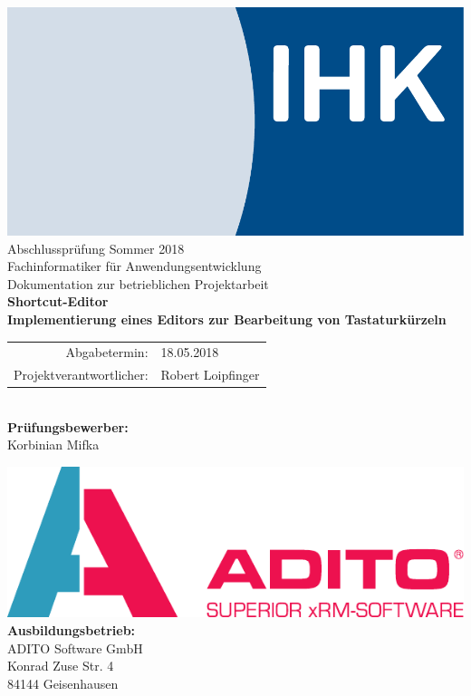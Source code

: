 \begin{titlepage}

\begin{center}
\includegraphics[scale=0.25]{../img/LogoIHK.pdf}\\[1ex]
\Large{Abschlussprüfung Sommer 2018}\\[3ex]

\Large{Fachinformatiker für Anwendungsentwicklung}\\
\LARGE{Dokumentation zur betrieblichen Projektarbeit}\\[4ex]

\huge{\textbf{Shortcut-Editor}}\\[1.5ex]
\Large{\textbf{Implementierung eines Editors zur Bearbeitung von Tastaturkürzeln}}\\[4ex]

\normalsize
\begin{tabularx}{0.54\textwidth}{rl}
Abgabetermin: & 18.05.2018 \\
Projektverantwortlicher: & Robert Loipfinger\\
\end{tabularx}
\\[3em]

\textbf{Prüfungsbewerber:}\\
Korbinian Mifka\\

\vfill

\includegraphics[scale=0.7]{../img/ADITO_Logo}\\[2ex]
\textbf{Ausbildungsbetrieb:}\\
ADITO Software GmbH\\
Konrad Zuse Str. 4\\
84144 Geisenhausen\\[5em]
\end{center}


\end{titlepage}
